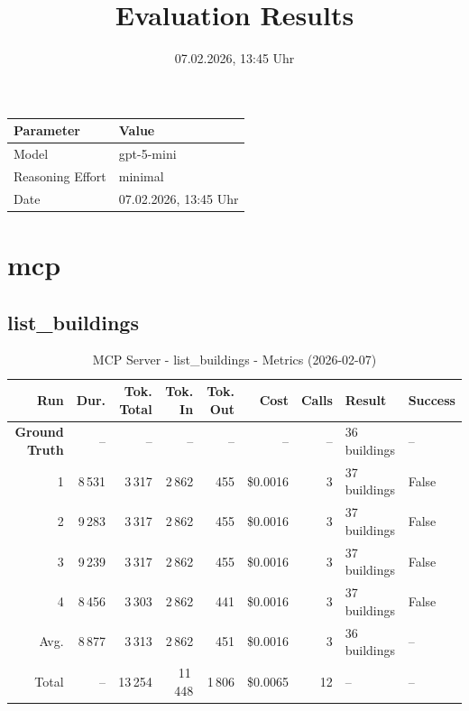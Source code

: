 \documentclass[a4paper,11pt]{article}
\title{Evaluation Results}
\date{07.02.2026, 13:45 Uhr}
\begin{document}
\maketitle

\begin{table}[H]
\centering
\begin{tabular}{l l}
\toprule
\textbf{Parameter} & \textbf{Value} \\
\midrule
Model & gpt-5-mini \\
Reasoning Effort & minimal \\
Date & 07.02.2026, 13:45 Uhr \\
\bottomrule
\end{tabular}
\end{table}

\tableofcontents
\clearpage

\section{mcp}

\subsection{list\_buildings}

\begin{table}[ht]
\centering
\scriptsize
\caption{MCP Server - list\_buildings - Metrics (2026-02-07)}
\label{tab:mcp\_list\_buildings\_metrics\_2026-02-07}
\begin{tabular}{r r r r r r r p{3cm} l}
\hline
Run & Dur. & Tok. Total & Tok. In & Tok. Out & Cost & Calls & Result & Success \\
\hline
\textbf{Ground Truth} & -- & -- & -- & -- & -- & -- & 36 buildings & -- \\
1 & 8\,531 & 3\,317 & 2\,862 & 455 & \$0.0016 & 3 & 37 buildings & False \\
2 & 9\,283 & 3\,317 & 2\,862 & 455 & \$0.0016 & 3 & 37 buildings & False \\
3 & 9\,239 & 3\,317 & 2\,862 & 455 & \$0.0016 & 3 & 37 buildings & False \\
4 & 8\,456 & 3\,303 & 2\,862 & 441 & \$0.0016 & 3 & 37 buildings & False \\
\hline
Avg. & 8\,877 & 3\,313 & 2\,862 & 451 & \$0.0016 & 3 & 36 buildings & -- \\
Total & -- & 13\,254 & 11\,448 & 1\,806 & \$0.0065 & 12 & -- & -- \\
\hline
\end{tabular}
\end{table}
\end{document}
